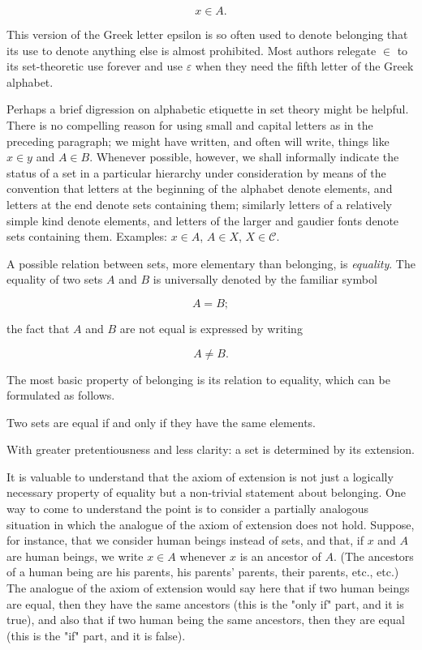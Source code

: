 \begin{equation*}
x \in A.
\end{equation*}

This version of the Greek letter epsilon is so often used to denote belonging that its use to denote anything else is almost prohibited. Most authors relegate $\in$ to its set-theoretic use forever and use $\varepsilon$ when they need the fifth letter of the Greek alphabet. 

Perhaps a brief digression on alphabetic etiquette in set theory might be helpful. There is no compelling reason for using small and capital letters as in the preceding paragraph; we might have written, and often will write, things like $x \in y$ and $A \in B$. Whenever possible, however, we shall informally indicate the status of a set in a particular hierarchy under consideration by means of the convention that letters at the beginning of the alphabet denote elements, and letters at the end denote sets containing them; similarly letters of a relatively simple kind denote elements, and letters of the larger and gaudier fonts denote sets containing them. Examples: $x \in A$, $A \in X$, $X \in \mathcal{C}$.


A possible relation between sets, more elementary than belonging, is \textit{equality}. The equality of two sets $A$ and $B$ is universally denoted by the familiar symbol 

\begin{equation*}
A = B;
\end{equation*}

the fact that $A$ and $B$ are not equal is expressed by writing 

\begin{equation*}
A \neq B.
\end{equation*}

The most basic property of belonging is its relation to equality, which can be formulated as follows. 

\begin{named} Two sets are equal if and only if they have the same elements.
\end{named}

With greater pretentiousness and less clarity: a set is determined by its extension. 

It is valuable to understand that the axiom of extension is not just a logically necessary property of equality but a non-trivial statement about belonging. One way to come to understand the point is to consider a partially analogous situation in which the analogue of the axiom of extension does not hold. Suppose, for instance, that we consider human beings instead of sets, and that, if $x$ and $A$ are human beings, we write $x \in A$ whenever $x$ is an ancestor of $A$. (The ancestors of a human being are his parents, his parents' parents, their parents, etc., etc.) The analogue of the axiom of extension would say here that if two human beings are equal, then they have the same ancestors (this is the "only if" part, and it is true), and also that if two human being the same ancestors, then they are equal (this is the "if" part, and it is false). 

